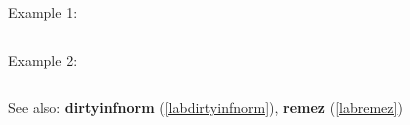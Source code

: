 \noindent Example 1: 
\begin{center}\begin{minipage}{15cm}\begin{Verbatim}[frame=single]
\end{Verbatim}
\end{minipage}\end{center}
\noindent Example 2: 
\begin{center}\begin{minipage}{15cm}\begin{Verbatim}[frame=single]
\end{Verbatim}
\end{minipage}\end{center}
See also: \textbf{dirtyinfnorm} (\ref{labdirtyinfnorm}), \textbf{remez} (\ref{labremez})

